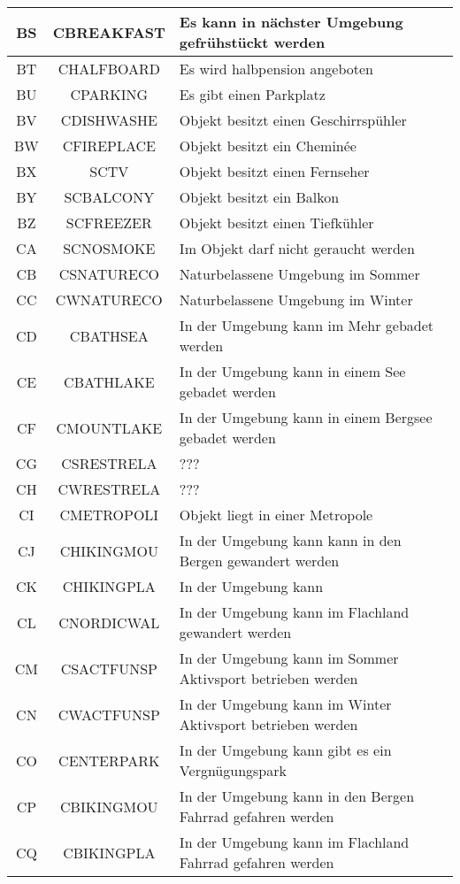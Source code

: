 \begin{longtable}{ | c | c | L{10cm} |}
	BS & CBREAKFAST & Es kann in nächster Umgebung gefrühstückt werden \\ \hline 
	BT & CHALFBOARD & Es wird halbpension angeboten \\ \hline 
	BU & CPARKING & Es gibt einen Parkplatz \\ \hline 
	BV & CDISHWASHE & Objekt besitzt einen Geschirrspühler \\ \hline 
	BW & CFIREPLACE & Objekt besitzt ein Cheminée \\ \hline 
	BX & SCTV & Objekt besitzt einen Fernseher \\ \hline 
	BY & SCBALCONY & Objekt besitzt ein Balkon \\ \hline 
	BZ & SCFREEZER & Objekt besitzt einen Tiefkühler \\ \hline 
	CA & SCNOSMOKE & Im Objekt darf nicht geraucht werden \\ \hline 
	CB & CSNATURECO & Naturbelassene Umgebung im Sommer \\ \hline 
	CC & CWNATURECO & Naturbelassene Umgebung im Winter \\ \hline 
	CD & CBATHSEA & In der Umgebung kann im Mehr gebadet werden \\ \hline 
	CE & CBATHLAKE & In der Umgebung kann in einem See gebadet werden \\ \hline 
	CF & CMOUNTLAKE & In der Umgebung kann in einem Bergsee gebadet werden \\ \hline 
	CG & CSRESTRELA & ??? \\ \hline 
	CH & CWRESTRELA & ??? \\ \hline 
	CI & CMETROPOLI & Objekt liegt in einer Metropole \\ \hline 
	CJ & CHIKINGMOU & In der Umgebung kann kann in den Bergen gewandert werden \\ \hline 
	CK & CHIKINGPLA& In der Umgebung kann  \\ \hline 
	CL & CNORDICWAL & In der Umgebung kann im Flachland gewandert werden \\ \hline 
	CM & CSACTFUNSP & In der Umgebung kann im Sommer Aktivsport betrieben werden \\ \hline 
	CN & CWACTFUNSP & In der Umgebung kann im Winter Aktivsport betrieben werden \\ \hline 
	CO & CENTERPARK & In der Umgebung kann gibt es ein Vergnügungspark \\ \hline 
	CP & CBIKINGMOU & In der Umgebung kann in den Bergen Fahrrad gefahren werden \\ \hline 
	CQ & CBIKINGPLA & In der Umgebung kann im Flachland Fahrrad gefahren werden \\ \hline 

\end{longtable}
